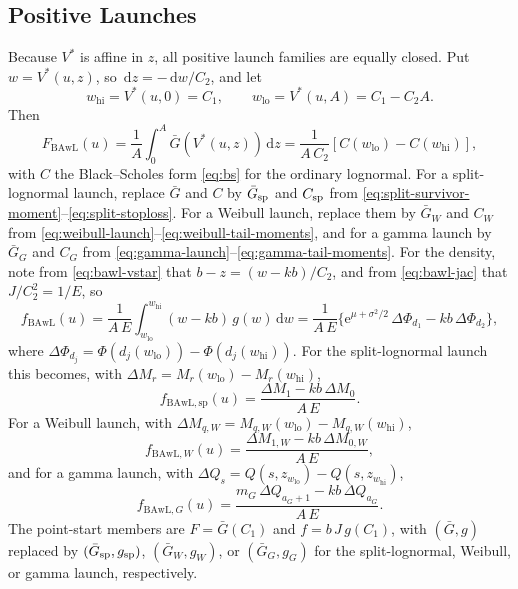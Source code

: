 \documentclass[12pt]{article}
\newcommand{\dd}{\,\mathrm{d}}
\newcommand{\PhiN}{\Phi}
\newcommand{\Gbar}{\bar{G}}
\newcommand{\e}{\mathrm{e}}
\theoremstyle{remark}
\begin{document}
\subsection{Positive Launches}
\label{sec:bawl-logn}
Because $V^{*}$ is affine in $z$, all positive launch families are equally closed. Put $w = V^{*}(u,z)$, so $\dd z = -\dd w / C_2$, and let
\begin{equation}
  w_{\mathrm{hi}} = V^{*}(u,0) = C_1,
  \qquad
  w_{\mathrm{lo}} = V^{*}(u,A) = C_1 - C_2 A .
\end{equation}
Then
\begin{equation}
  F_{\mathrm{BAwL}}(u)
  = \frac{1}{A}\int_0^A \Gbar\!\left(V^{*}(u,z)\right)\dd z
  = \frac{1}{A\,C_2}\left[C(w_{\mathrm{lo}}) - C(w_{\mathrm{hi}})\right],
  \label{eq:bawl-cdf-logn}
\end{equation}
with $C$ the Black--Scholes form \eqref{eq:bs} for the ordinary lognormal. For a split-lognormal launch, replace $\Gbar$ and $C$ by $\Gbar_{\rm sp}$ and $C_{\rm sp}$ from
\eqref{eq:split-survivor-moment}--\eqref{eq:split-stoploss}.
For a Weibull launch, replace them by $\Gbar_W$ and $C_W$ from
\eqref{eq:weibull-launch}--\eqref{eq:weibull-tail-moments}, and for a gamma launch by $\Gbar_G$ and $C_G$ from
\eqref{eq:gamma-launch}--\eqref{eq:gamma-tail-moments}. For the density,
note from
\eqref{eq:bawl-vstar} that $b - z = (w - kb)/C_2$, and from \eqref{eq:bawl-jac}
that $J/C_2^2 = 1/E$, so
\begin{equation}
  f_{\mathrm{BAwL}}(u)
  = \frac{1}{A\,E}\int_{w_{\mathrm{lo}}}^{w_{\mathrm{hi}}} (w - kb)\,g(w)\dd w
  = \frac{1}{A\,E}\Big\{
      \e^{\mu+\sigma^2/2}\,\Delta\PhiN_{d_1}
      - kb\,\Delta\PhiN_{d_2}
    \Big\},
  \label{eq:bawl-pdf-logn}
\end{equation}
where $\Delta\PhiN_{d_j} = \PhiN(d_j(w_{\mathrm{lo}})) - \PhiN(d_j(w_{\mathrm{hi}}))$. For the split-lognormal launch this becomes, with $\Delta M_r=M_r(w_{\mathrm{lo}})-M_r(w_{\mathrm{hi}})$,
\begin{equation}
  f_{\mathrm{BAwL,sp}}(u)
  =\frac{\Delta M_1-kb\,\Delta M_0}{A\,E}.
  \label{eq:bawl-pdf-split}
\end{equation}
For a Weibull launch, with $\Delta M_{q,W}=M_{q,W}(w_{\mathrm{lo}})-M_{q,W}(w_{\mathrm{hi}})$,
\begin{equation}
  f_{\mathrm{BAwL},W}(u)
   =\frac{\Delta M_{1,W}-kb\,\Delta M_{0,W}}{A\,E},
  \label{eq:bawl-pdf-weibull}
\end{equation}
and for a gamma launch, with $\Delta Q_s=Q(s,z_{w_{\mathrm{lo}}})-Q(s,z_{w_{\mathrm{hi}}})$,
\begin{equation}
  f_{\mathrm{BAwL},G}(u)
   =\frac{m_G\,\Delta Q_{a_G+1}-kb\,\Delta Q_{a_G}}{A\,E}.
  \label{eq:bawl-pdf-gamma}
\end{equation}
The point-start members are $F = \Gbar(C_1)$ and $f = b\,J\,g(C_1)$, with $(\Gbar,g)$ replaced by $(\Gbar_{\rm sp},g_{\rm sp})$, $(\Gbar_W,g_W)$, or $(\Gbar_G,g_G)$ for the split-lognormal, Weibull, or gamma launch, respectively.
\end{document}
